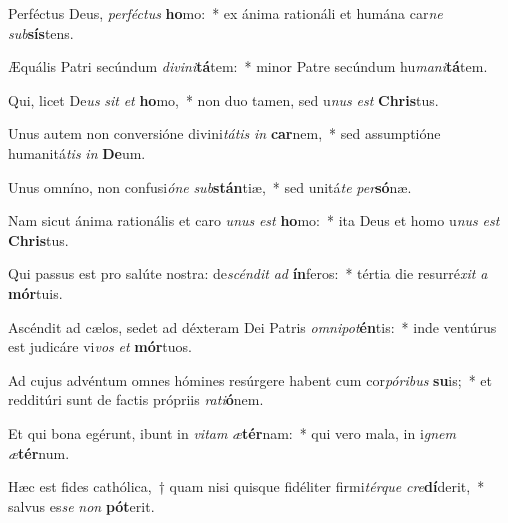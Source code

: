 \item Perféctus Deus, \textit{per}\textit{féc}\textit{tus} \textbf{ho}mo:~* ex ánima rationáli et humána car\textit{ne} \textit{sub}\textbf{sís}tens.
\item Æquális Patri secúndum \textit{di}\textit{vi}\textit{ni}\textbf{tá}tem:~* minor Patre secúndum hu\textit{ma}\textit{ni}\textbf{tá}tem.
\item Qui, licet De\textit{us} \textit{sit} \textit{et} \textbf{ho}mo,~* non duo tamen, sed u\textit{nus} \textit{est} \textbf{Chris}tus.
\item Unus autem non conversióne divini\textit{tá}\textit{tis} \textit{in} \textbf{car}nem,~* sed assumptióne humanitá\textit{tis} \textit{in} \textbf{De}um.
\item Unus omníno, non confusi\textit{ó}\textit{ne} \textit{sub}\textbf{stán}tiæ,~* sed unitá\textit{te} \textit{per}\textbf{só}næ.
\item Nam sicut ánima rationális et caro \textit{u}\textit{nus} \textit{est} \textbf{ho}mo:~* ita Deus et homo u\textit{nus} \textit{est} \textbf{Chris}tus.
\item Qui passus est pro salúte nostra: de\textit{scén}\textit{dit} \textit{ad} \textbf{ín}feros:~* tértia die resurré\textit{xit} \textit{a} \textbf{mór}tuis.
\item Ascéndit ad cælos, sedet ad déxteram Dei Patris \textit{om}\textit{ni}\textit{pot}\textbf{én}tis:~* inde ventúrus est judicáre vi\textit{vos} \textit{et} \textbf{mór}tuos.
\item Ad cujus advéntum omnes hómines resúrgere habent cum cor\textit{pó}\textit{ri}\textit{bus} \textbf{su}is;~* et redditúri sunt de factis própriis \textit{ra}\textit{ti}\textbf{ó}nem.
\item Et qui bona egérunt, ibunt in \textit{vi}\textit{tam} \textit{æ}\textbf{tér}nam:~* qui vero mala, in i\textit{gnem} \textit{æ}\textbf{tér}num.
\item Hæc est fides cathólica,~† quam nisi quisque fidéliter firmi\textit{tér}\textit{que} \textit{cre}\textbf{dí}derit,~* salvus es\textit{se} \textit{non} \textbf{pót}erit.
